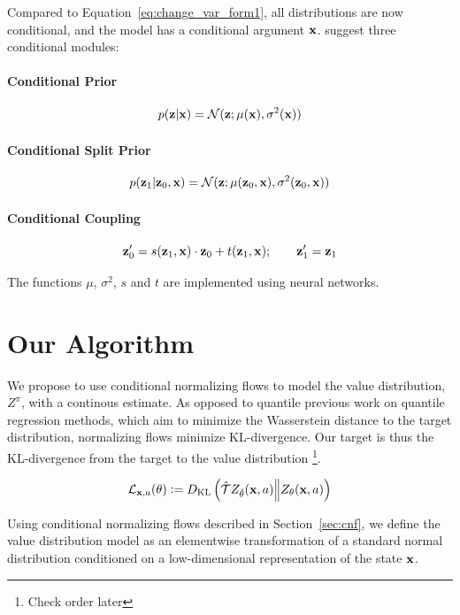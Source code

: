 \documentclass[twoside]{article}
\begin{document}
\noindent
Compared to Equation~\eqref{eq:change_var_form1}, all distributions are now
conditional, and the model has a conditional argument \(\textbf{x}\).
\citet{winkler19} suggest three conditional modules:

\paragraph{Conditional Prior}
\begin{equation*}
  p(\textbf{z} \vert \textbf{x}) = \mathcal{N}(\textbf{z} ; \mu(\textbf{x}), \sigma^2(\textbf{x}))
\end{equation*}
\paragraph{Conditional Split Prior}
\begin{equation*}
  p(\textbf{z}_1 \vert \textbf{z}_0, \textbf{x}) =
  \mathcal{N} (\textbf{z} ; \mu(\textbf{z}_0, \textbf{x}), \sigma^2(\textbf{z}_0, \textbf{x}))
\end{equation*}
\paragraph{Conditional Coupling}
\begin{equation*}
  \textbf{z}^\prime_0 = 
  s(\textbf{z}_1, \textbf{x}) \cdot \textbf{z}_0 + t(\textbf{z}_1, \textbf{x}); \qquad \textbf{z}^\prime_1 = \textbf{z}_1
\end{equation*}

The functions \(\mu\), \(\sigma^2\), \(s\) and \(t\) are implemented using
neural networks.

\section{Our Algorithm}

We propose to use conditional normalizing flows to model the value distribution,
\(Z^\pi\), with a continous estimate. As opposed to quantile previous work on 
quantile regression methods, which aim to minimize the Wasserstein distance
to the target distribution, normalizing flows minimize KL-divergence. Our target
is thus the KL-divergence from the target to the value distribution
\footnote{Check order later}.

\begin{equation}
  \mathcal{L}_{\textbf{x},a}(\theta) \vcentcolon= D_{\mathrm{KL}}\left( \hat{\mathcal{T}}
  Z_{\tilde{\theta}}(\textbf{x},a) \middle\Vert Z_{\theta}(\textbf{x},a) \right)
\end{equation}

Using conditional normalizing flows described in Section~\ref{sec:cnf}, we
define the value distribution model as an elementwise transformation of a
standard normal distribution conditioned on a low-dimensional representation of
the state \(\textbf{x}\).
\end{document}
